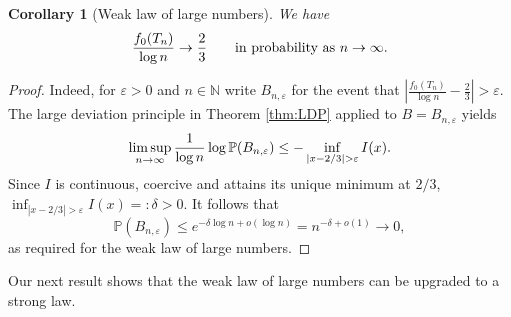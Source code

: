 \documentclass[11pt,a4paper]{article}
\numberwithin{equation}{section}
\newtheorem {corollary}[theorem]{Corollary}
\def\NN{\mathbb{N}}
\def\PP{\mathbb{P}}
\begin{document}
\begin{corollary}[Weak law of large numbers]\label{cor:WLLN}
    We have
    $$
   \frac{f_0(T_n)}{\log n}\to{2\over 3}\qquad\text{in probability as}\ n\to\infty.
   $$
\end{corollary}
\begin{proof}
   Indeed, for $\varepsilon>0$ and $n\in\NN$ write $B_{n,\varepsilon}$ for the event that $|\tfrac{f_0(T_n)}{\log n}-\tfrac{2}{3}|>\varepsilon$. The large deviation principle in Theorem \ref{thm:LDP} applied to $B=B_{n,\varepsilon}$ yields
   $$
   \limsup_{n\to\infty}{1\over\log n}\log\PP(B_{n,\varepsilon}) \leq -\inf_{|x-2/3|>\varepsilon}I(x).
   $$
   Since $I$ is continuous, coercive and attains its unique minimum at $2/3$, $\inf_{|x-2/3|>\varepsilon}I(x)=:\delta>0$. It follows that
   \begin{equation}\label{eq:WLLN}
   \PP(B_{n,\varepsilon}) \leq e^{-\delta\log n + o(\log n)} = n^{-\delta + o(1)} \to 0,  
   \end{equation}
   as required for the weak law of large numbers. 
\end{proof}

Our next result shows that the weak law of large numbers can be upgraded to a strong law.
\end{document}
